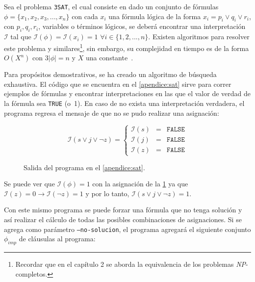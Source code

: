 Sea el problema \texttt{3SAT}, el cual consiste en dado un conjunto de fórmulas
$\phi = \{x_{1}, x_{2}, x_{3}, ..., x_{n}\}$ con cada $x_{i}$ una fórmula lógica
de la forma $x_{i} = p_{i} \lor q_{i} \lor r_{i} $, con $ p_{i}, q_{i}, r_{i}$,
variables o términos lógicos, se deberá encontrar una
interpretación $\mathcal{I}$ tal que $\mathcal{I}(\phi) = \mathcal{I}(x_{i}) = 1$
$\forall i \in \{1,2,...,n\}$. Existen algoritmos para resolver este problema
y similares\footnote{Recordar que en el capítulo 2 se aborda la equivalencia de
los problemas \textsl{NP}-completos.}, sin embargo, su complejidad en tiempo es de la
forma $O(X^{n})$ con $3|\phi| = n$ y $X$ una constante~\cite{Marques-Silva}.

Para propósitos demostrativos, se ha creado un algoritmo de búsqueda exhaustiva.
El código que se encuentra en el \cref{apendice:sat} sirve para correr
ejemplos de fórmulas y encontrar interpretaciones en las que el valor de
verdad de la fórmula sea \texttt{TRUE} (o~1). En caso de no exista una
interpretación verdadera, el programa regresa el mensaje de que no se pudo
realizar una asignación:

\begin{figure}[h]
\begin{displaymath} 
\mathcal{I}(s \lor j \lor \neg z) =\left\{
  \begin{array}{rcl}
    \mathcal{I}(s) & = & \texttt{FALSE} \\
    \mathcal{I}(j) & = & \texttt{FALSE}  \\
    \mathcal{I}(z) & = & \texttt{FALSE} 
  \end{array}
  \right.
\end{displaymath}
\caption[short caption]{Salida del programa en el \cref{apendice:sat}.}
\label{fig:salida1}
\end{figure} 

Se puede ver que $\mathcal{I}(\phi) = 1$ con la asignación de la \cref{fig:salida1} 
ya que $\mathcal{I}(z) = 0 \rightarrow \mathcal{I}(\neg z) = 1$ y
por lo tanto, $\mathcal{I}(s \lor j \lor \neg z) = 1$.

Con este mismo programa se puede forzar una fórmula que no tenga solución y así
realizar el cálculo de todas las posibles combinaciones de asignaciones.
Si se agrega  como parámetro \texttt{--no-solucion}, el programa agregará el
siguiente conjunto $\phi_{imp}$ de cláusulas al programa:

